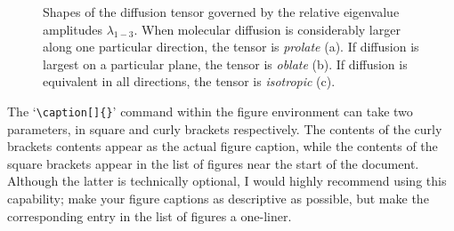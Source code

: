 \begin{figure}[t]
\centering
{}
\hfill
{}
\hfill
{}
\caption[Shapes of the diffusion tensor governed by the relative eigenvalue amplitudes]%
{Shapes of the diffusion tensor governed by the relative eigenvalue amplitudes $\lambda_{1-3}$. When molecular diffusion is considerably larger along one particular direction, the tensor is {\em prolate} (a). If diffusion is largest on a particular plane, the tensor is {\em oblate} (b). If diffusion is equivalent in all directions, the tensor is {\em isotropic} (c).}
\label{fig_tensor_shapes}
\end{figure}%
%

The `\verb+\caption[]{}+' command within the figure environment can take two parameters, in square and curly brackets respectively. The contents of the curly brackets contents appear as the actual figure caption, while the contents of the square brackets appear in the list of figures near the start of the document. Although the latter is technically optional, I would highly recommend using this capability; make your figure captions as descriptive as possible, but make the corresponding entry in the list of figures a one-liner.


